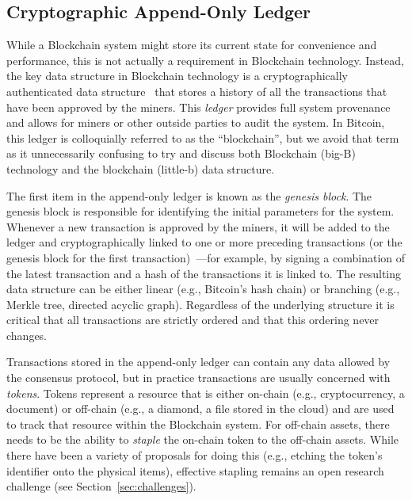 \subsection{Cryptographic Append-Only Ledger}
While a Blockchain system might store its current state for convenience and performance, this is not actually a requirement in Blockchain technology.
Instead, the key data structure in Blockchain technology is a cryptographically authenticated data structure~\cite{tamassia2003authenticated} that stores a history of all the transactions that have been approved by the miners.
This \emph{ledger} provides full system provenance and allows for miners or other outside parties to audit the system.
In Bitcoin, this ledger is colloquially referred to as the ``blockchain'', but we avoid that term as it unnecessarily confusing to try and discuss both Blockchain (big-B) technology and the blockchain (little-b) data structure.

The first item in the append-only ledger is known as the \emph{genesis block}.
The genesis block is responsible for identifying the initial parameters for the system.
Whenever a new transaction is approved by the miners, it will be added to the ledger and cryptographically linked to one or more preceding transactions (or the genesis block for the first transaction)~\cite{bayer1993improving,haber1990time,haber1997secure}---for example, by signing a combination of the latest transaction and a hash of the transactions it is linked to.
The resulting data structure can be either linear (e.g., Bitcoin's hash chain) or branching (e.g., Merkle tree, directed acyclic graph).
Regardless of the underlying structure it is critical that all transactions are strictly ordered and that this ordering never changes.

Transactions stored in the append-only ledger can contain any data allowed by the consensus protocol, but in practice transactions are usually concerned with \emph{tokens}.
Tokens represent a resource that is either on-chain (e.g., cryptocurrency, a document) or off-chain (e.g., a diamond, a file stored in the cloud) and are used to track that resource within the Blockchain system.
For off-chain assets, there needs to be the ability to \emph{staple} the on-chain token to the off-chain assets.
While there have been a variety of proposals for doing this (e.g., etching the token's identifier onto the physical items), effective stapling remains an open research challenge (see Section~\ref{sec:challenges}).

